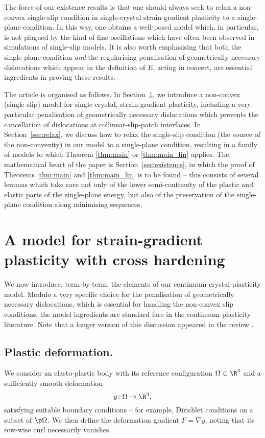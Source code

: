 \documentclass[11pt,reqno]{amsart}
\theoremstyle{plain}
\theoremstyle{definition}
\theoremstyle{remark}
\begin{document}
The force of our existence results is that one should always seek to relax a non-convex single-slip condition in single-crystal strain-gradient plasticity to a single-plane condition. In this way, one obtains a well-posed model which, in particular, is not plagued by the kind of fine oscillations which have often been observed in simulations of single-slip models. It is also worth emphasising that both the single-plane condition {\em and} the regularising penalisation of geometrically necessary dislocations which appear in the definition of $E$, acting in concert, are essential ingredients in proving these results.

The article is organised as follows. In Section~\ref{sec:model}, we introduce a non-convex (single-slip) model for single-crystal, strain-gradient plasticity, including a very particular penalisation of geometrically necessary dislocations which prevents the cancellation of dislocations at collinear-slip-patch interfaces. In Section~\ref{sec:relax}, we discuss how to relax the single-slip condition (the source of the non-convexity) in our model to a single-plane condition, resulting in a family of models to which Theorem \ref{thm:main} or \ref{thm:main_lin} applies. The mathematical heart of the paper is Section~\ref{sec:existence}, in which the proof of Theorems \ref{thm:main} and \ref{thm:main_lin} is to be found -- this consists of several lemmas which take care not only of the lower semi-continuity of the plastic and elastic parts of the single-plane energy, but also of the preservation of the single-plane condition along minimising sequences.
 
\section{A model for strain-gradient plasticity with cross hardening} \label{sec:model}

We now introduce, term-by-term, the elements of our continuum crystal-plasticity model. Modulo a very specific choice for the penalisation of geometrically necessary dislocations, which is essential for handling the non-convex slip conditions, the model ingredients are standard fare in the continuum-plasticity literature. Note that a longer version of this discussion appeared in the review \cite{AD_book}.
\subsection{Plastic deformation.} 
We consider an elasto-plastic body with its reference configuration $\Omega \subset \R^3$ and a sufficiently smooth deformation 
$$
y\colon \Omega \to \R^3,
$$
satisfying suitable boundary conditions -- for example, Dirichlet conditions on a subset of $\p\Omega$. We then define the deformation gradient $F = \nabla y$, noting that its row-wise curl necessarily vanishes.
\end{document}
